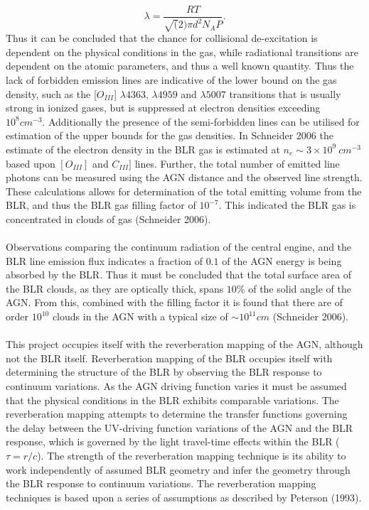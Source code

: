 \documentclass[a4paper, 12pt, twoside]{article}
\begin{document}
\begin{equation}
\lambda = \frac{RT}{\sqrt(2)\pi d^{2}N_{A}P}.
\label{eq:mean_free_path}
\end{equation} 
Thus it can be concluded that the chance for collisional de-excitation is dependent on the physical conditions in the gas, while radiational transitions are dependent on the atomic parameters, and thus a well known quantity. Thus the lack of forbidden emission lines are indicative of the lower bound on the gas density, such as the [$O_{III}$] $\lambda 4363$, $\lambda 4959$ and $\lambda 5007$ transitions that is usually strong in ionized gases, but is suppressed at electron densities exceeding ~$10^{8} cm^{-3}$. Additionally the presence of the semi-forbidden lines can be utilised for estimation of the upper bounds for the gas densities. In Schneider 2006 the estimate of the electron density in the BLR gas is estimated at $n_{e} \sim 3\times 10^{9}\ cm^{-3}$ based upon $[O_{III}]$ and $C_{III}]$ lines. Further, the total number of emitted line photons can be measured using the AGN distance and the observed line strength. These calculations allows for determination of the total emitting volume from the BLR, and thus the BLR gas filling factor of $10^{-7}$. This indicated the BLR gas is concentrated in clouds of gas (Schneider 2006).  \\
\\
Observations comparing the continuum radiation of the central engine, and the BLR line emission flux indicates a fraction of $0.1$ of the AGN energy is being absorbed by the BLR. Thus it must be concluded that the total surface area of the BLR clouds, as they are optically thick, spans $10\%$ of the solid angle of the AGN. From this, combined with the filling factor it is found that there are of order $10^{10}$ clouds in the AGN with a typical size of $\sim10^{11} cm$ (Schneider 2006). \\
\\
This project occupies itself with the reverberation mapping of the AGN, although not the BLR itself. Reverberation mapping of the BLR occupies itself with determining the structure of the BLR by observing the BLR response to continuum variations. As the AGN driving function varies it must be assumed that the physical conditions in the BLR exhibits comparable variations. The reverberation mapping attempts to determine the transfer functions governing the delay between the UV-driving function variations of the AGN and the BLR response, which is governed by the light travel-time effects within the BLR ($\tau=r/c$). The strength of the reverberation mapping technique is its ability to work independently of assumed BLR geometry and infer the geometry through the BLR response to continuum variations. The reverberation mapping techniques is based upon a series of assumptions as described by Peterson (1993).
\end{document}
